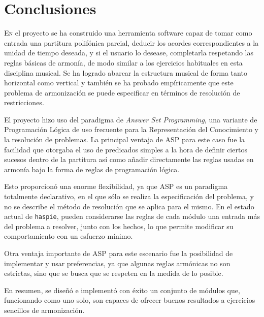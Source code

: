 \chapter{Conclusiones}
\label{chap:conclusiones}
\vspace{0.5cm}

\lettrine{E}{n} el proyecto se ha construido una herramienta software capaz de tomar como entrada una partitura polifónica parcial, deducir los acordes correspondientes a la unidad de tiempo deseada, y si el usuario lo desease, completarla respetando las reglas básicas de armonía, de modo similar a los ejercicios habituales en esta disciplina musical. Se ha logrado abarcar la estructura musical de forma tanto horizontal como vertical y también se ha probado empíricamente que este problema de armonización se puede especificar en términos de resolución de restricciones.

El proyecto hizo uso del paradigma de \textit{Answer Set Programming}, una variante de Programación Lógica de uso frecuente para la Representación del Conocimiento y la resolución de problemas. La principal ventaja de ASP para este caso fue la facilidad que otorgaba el uso de predicados simples a la hora de definir ciertos sucesos dentro de la partitura así como añadir directamente las reglas usadas en armonía bajo la forma de reglas de programación lógica.

 Esto proporcionó una enorme flexibilidad, ya que ASP es un paradigma totalmente declarativo, en el que sólo se realiza la especificación del problema, y no se describe el método de resolución que se aplica para el mismo. En el estado actual de \texttt{haspie}, pueden considerarse las reglas de cada módulo una entrada más del problema a resolver, junto con los hechos, lo que permite modificar su comportamiento con un esfuerzo mínimo.
 
  Otra ventaja importante de ASP para este escenario fue la posibilidad de implementar y usar preferencias, ya que algunas reglas armónicas no son estrictas, sino que se busca que se respeten en la medida de lo posible. 
  
  En resumen, se diseñó e implementó con éxito un conjunto de módulos que, funcionando como uno solo, son capaces de ofrecer buenos resultados a ejercicios sencillos de armonización.

